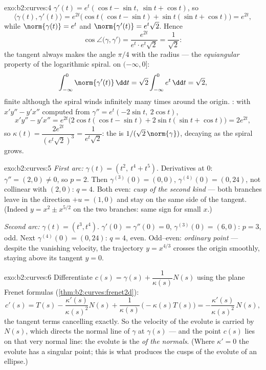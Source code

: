 \begin{solution}{exo:b2:curves:4}
$\gamma'(t) = e^t(\cos t - \sin t,\ \sin t + \cos t)$, so
\[
\langle \gamma(t), \gamma'(t)\rangle = e^{2t}
\bigl(\cos t(\cos t - \sin t) + \sin t(\sin t + \cos t)\bigr)
= e^{2t},
\]
while $\norm{\gamma(t)} = e^t$ and $\norm{\gamma'(t)} =
e^t\sqrt 2$. Hence
\[
\cos\angle\bigl(\gamma, \gamma'\bigr)
= \frac{e^{2t}}{e^t \cdot e^t\sqrt2} = \frac{1}{\sqrt2} :
\]
the tangent always makes the angle $\pi/4$ with the radius --- the
\emph{equiangular} property of the logarithmic spiral. 
on $(-\infty, 0]$:
\[
\int_{-\infty}^0 \norm{\gamma'(t)}\,\dd t
= \sqrt2\int_{-\infty}^0 e^t\,\dd t = \sqrt 2 ,
\]
finite although the spiral winds infinitely many times around the
origin. : with $x'y'' - y'x''$ computed from $\gamma'' =
e^t(-2\sin t,\ 2\cos t)$,
\[
x'y'' - y'x'' = e^{2t}\bigl(2\cos t(\cos t - \sin t)
+ 2\sin t(\sin t + \cos t)\bigr) = 2e^{2t},
\]
so $\kappa(t) = \dfrac{2e^{2t}}{(e^t\sqrt2)^3} =
\dfrac{1}{e^t\sqrt2}$: the  is $1/(\sqrt2\,
\norm{\gamma})$, decaying as the spiral grows.
\end{solution}

\begin{solution}{exo:b2:curves:5}
\emph{First arc:} $\gamma(t) = (t^2,\ t^4 + t^5)$. Derivatives at
$0$: $\gamma'' = (2, 0) \neq 0$, so $p = 2$. Then $\gamma^{(3)}(0)
= (0, 0)$, $\gamma^{(4)}(0) = (0, 24)$, not collinear with $(2,
0)$: $q = 4$. Both even: \emph{cusp of the second kind} --- both
branches leave in the direction $+u = (1,0)$ and stay on the same
side of the tangent. (Indeed $y = x^2 \pm x^{5/2}$ on the two
branches: same sign for small $x$.)

\emph{Second arc:} $\gamma(t) = (t^3, t^4)$. $\gamma'(0) =
\gamma''(0) = 0$, $\gamma^{(3)}(0) = (6, 0)$: $p = 3$, odd. Next
$\gamma^{(4)}(0) = (0, 24)$: $q = 4$, even. Odd--even:
\emph{ordinary point} --- despite the vanishing velocity, the
trajectory $y = x^{4/3}$ crosses the origin smoothly, staying
above its tangent $y = 0$.
\end{solution}

\begin{solution}{exo:b2:curves:6}
Differentiate $c(s) = \gamma(s) + \dfrac{1}{\kappa(s)}N(s)$ using
the plane Frenet formulas
(\cref{thm:b2:curves:frenet2d}):
\[
c'(s) = T(s) - \frac{\kappa'(s)}{\kappa(s)^2}N(s)
+ \frac{1}{\kappa(s)}\,\bigl(-\kappa(s)T(s)\bigr)
= -\frac{\kappa'(s)}{\kappa(s)^2}\,N(s) ,
\]
the tangent terms cancelling exactly. So the velocity of the
evolute is carried by $N(s)$, which directs the normal line of
$\gamma$ at $\gamma(s)$ --- and the point $c(s)$ lies on that very
normal line: the evolute is the \emph{ of the normals}.
(Where $\kappa' = 0$ the evolute has a singular point; this is
what produces the cusps of the evolute of an ellipse.)
\end{solution}

